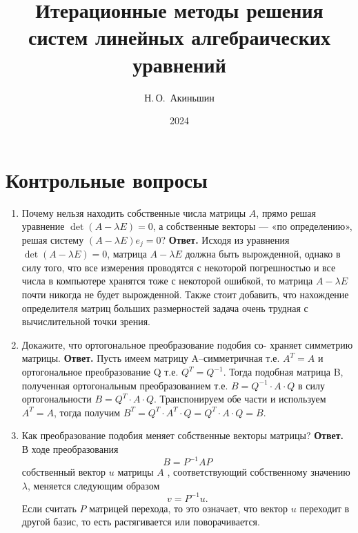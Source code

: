 \documentclass{article}
\title{Итерационные методы решения систем
линейных алгебраических уравнений}
\author{Н.\,О.~Акиньшин}
\date{2024}
\begin{document}
    \maketitle
    \newpage
    \tableofcontents
    \newpage

    \section{Контрольные вопросы}
    \begin{enumerate}
        \item Почему нельзя находить собственные числа матрицы $A$,
        прямо решая уравнение \mbox{$\det (A - \lambda E) = 0 $}, а собственные
        векторы — «по определению», решая систему $ ( A - \lambda E)e_j = 0$?
        \newline 
        {\bfseries Ответ. } Исходя из уравнения $\det (A - \lambda E) = 0 $, матрица 
        $A - \lambda E$ должна быть вырожденной, однако в силу того, что все измерения проводятся 
        с некоторой погрешностью и все числа в компьютере хранятся тоже с некоторой ошибкой, то 
        матрица $A - \lambda E$ почти никогда не будет вырожденной. Также стоит добавить, что 
        нахождение определителя матриц больших размерностей задача очень трудная с вычислительной 
        точки зрения. 
        \item Докажите, что ортогональное преобразование подобия со-
        храняет симметрию матрицы.
        \newline
        {\bfseries Ответ. } 
	Пусть имеем матрицу A--симметричная т.е. $A^T=A$ и ортогональное преобразование Q т.е. $Q^T=Q^{-1}$. Тогда подобная матрица B, полученная ортогональным  преобразованием т.е. $B=Q^{-1} \cdot A \cdot Q$ в силу ортогональности $B=Q^T \cdot A \cdot Q$. Транспонируем обе части и используем $A^T=A$, тогда получим $B^T = Q^T \cdot A^T \cdot Q = Q^T \cdot A \cdot Q=B$.
        \item Как преобразование подобия меняет собственные векторы
        матрицы?
        \newline
        {\bfseries Ответ. } 
        В ходе преобразования 
        \begin{equation*}
            B = P^{-1} A P
        \end{equation*}
        собственный вектор $u$ матрицы $A$ , соответствующий собственному значению $\lambda$, меняется следующим образом
        \begin{equation*}
            v = P^{-1} u.
        \end{equation*}
        Если считать $P$ матрицей перехода, то это означает, что вектор $u$ переходит в другой базис, то есть растягивается или поворачивается. 


\end{enumerate}
\end{document}
